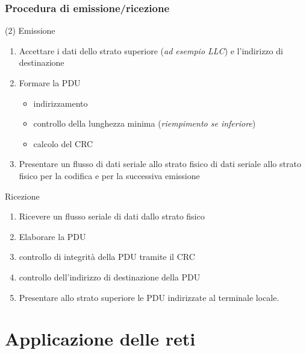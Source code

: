 \documentclass{book}
\begin{document}
\subsection{Procedura di emissione/ricezione}
\begin{tasks}(2)
	\task Emissione
	\begin{enumerate}
		\item Accettare i dati dello strato superiore (\textit{ad esempio LLC})
			e l'indirizzo di destinazione
		\item Formare la PDU
			\begin{itemize}
				\item indirizzamento
				\item controllo della lunghezza minima (\textit{riempimento se
					inferiore})
				\item calcolo del CRC
			\end{itemize}
		\item Presentare un flusso di dati seriale allo strato fisico di dati
			seriale allo strato fisico per la codifica e per la successiva
			emissione
	\end{enumerate}
	\task Ricezione
	\begin{enumerate}
		\item Ricevere un flusso seriale di dati dallo strato fisico
		\item Elaborare la PDU
		\item controllo di integrità della PDU tramite il CRC
		\item controllo dell'indirizzo di destinazione della PDU
		\item Presentare allo strato superiore le PDU indirizzate al terminale
			locale.
	\end{enumerate}
\end{tasks}


\chapter{Applicazione delle reti}
\printindex
\end{document}
